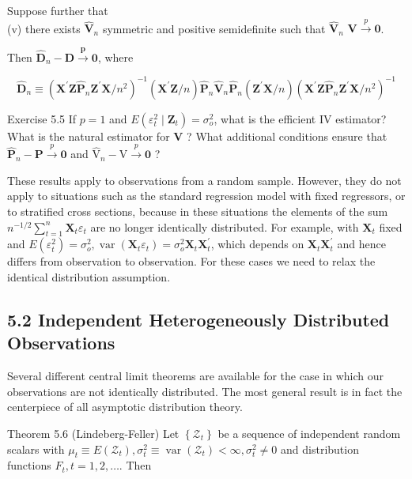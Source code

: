 \documentclass[10pt]{article}
\begin{document}
Suppose further that\\
(v) there exists $\hat{\mathbf{V}}_{n}$ symmetric and positive semidefinite such that $\hat{\mathbf{V}}_{n}$ $\mathbf{V} \xrightarrow{p} \mathbf{0}$.

Then $\hat{\mathbf{D}}_{n}-\mathbf{D} \xrightarrow{\boldsymbol{p}} \mathbf{0}$, where

$$
\hat{\mathbf{D}}_{n} \equiv\left(\mathbf{X}^{\prime} \mathbf{Z} \hat{\mathbf{P}}_{n} \mathbf{Z}^{\prime} \mathbf{X} / n^{2}\right)^{-1}\left(\mathbf{X}^{\prime} \mathbf{Z} / n\right) \hat{\mathbf{P}}_{n} \hat{\mathbf{V}}_{n} \hat{\mathbf{P}}_{n}\left(\mathbf{Z}^{\prime} \mathbf{X} / n\right)\left(\mathbf{X}^{\prime} \mathbf{Z} \hat{\mathbf{P}}_{n} \mathbf{Z}^{\prime} \mathbf{X} / n^{2}\right)^{-1}
$$

Exercise 5.5 If $p=1$ and $E\left(\varepsilon_{t}^{2} \mid \mathbf{Z}_{t}\right)=\sigma_{o}^{2}$, what is the efficient IV estimator? What is the natural estimator for $\mathbf{V}$ ? What additional conditions ensure that $\hat{\mathbf{P}}_{n}-\mathbf{P} \xrightarrow{p} \mathbf{0}$ and $\hat{\mathrm{V}}_{n}-\mathrm{V} \xrightarrow{p} \mathbf{0}$ ?

These results apply to observations from a random sample. However, they do not apply to situations such as the standard regression model with fixed regressors, or to stratified cross sections, because in these situations the elements of the sum $n^{-1 / 2} \sum_{t=1}^{n} \mathbf{X}_{t} \varepsilon_{t}$ are no longer identically distributed. For example, with $\mathbf{X}_{t}$ fixed and $E\left(\varepsilon_{t}^{2}\right)=\sigma_{o}^{2}, \operatorname{var}\left(\mathbf{X}_{t} \varepsilon_{t}\right)=\sigma_{o}^{2} \mathbf{X}_{t} \mathbf{X}_{t}^{\prime}$, which depends on $\mathbf{X}_{t} \mathbf{X}_{t}^{\prime}$ and hence differs from observation to observation. For these cases we need to relax the identical distribution assumption.

\subsection*{5.2 Independent Heterogeneously Distributed Observations}
Several different central limit theorems are available for the case in which our observations are not identically distributed. The most general result is in fact the centerpiece of all asymptotic distribution theory.

Theorem 5.6 (Lindeberg-Feller) Let $\left\{\mathcal{Z}_{t}\right\}$ be a sequence of independent random scalars with $\mu_{t} \equiv E\left(\mathcal{Z}_{t}\right), \sigma_{t}^{2} \equiv \operatorname{var}\left(\mathcal{Z}_{t}\right)<\infty, \sigma_{t}^{2} \neq 0$ and distribution functions $F_{t}, t=1,2, \ldots$. Then
\end{document}
